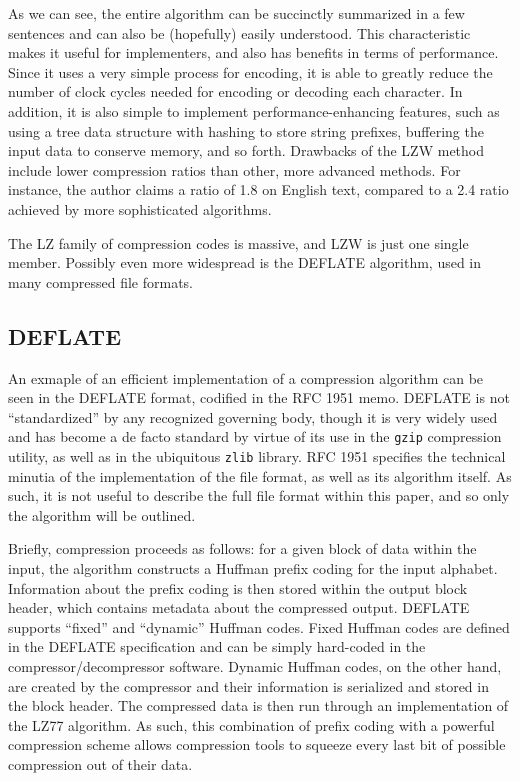\documentclass[12pt]{article}
\begin{document}
As we can see, the entire algorithm can be succinctly summarized in a
few sentences and can also be (hopefully) easily understood. This
characteristic makes it useful for implementers, and also has benefits
in terms of performance. Since it uses a very simple process for
encoding, it is able to greatly reduce the number of clock cycles
needed for encoding or decoding each character. In addition, it is
also simple to implement performance-enhancing features, such as using
a tree data structure with hashing to store string prefixes, buffering
the input data to conserve memory, and so forth. Drawbacks of the LZW
method include lower compression ratios than other, more advanced
methods. For instance, the author claims a ratio of 1.8 on English
text, compared to a 2.4 ratio achieved by more sophisticated
algorithms. \cite{LempelZivWelch}

The LZ family of compression codes is massive, and LZW is just one
single member. Possibly even more widespread is the DEFLATE algorithm,
used in many compressed file formats.

\subsection{DEFLATE}

An exmaple of an efficient implementation of a compression algorithm
can be seen in the DEFLATE format, codified in the RFC 1951
memo. \cite{RFC1951} DEFLATE is not ``standardized'' by any recognized
governing body, though it is very widely used and has become a de
facto standard by virtue of its use in the \texttt{gzip} compression
utility, as well as in the ubiquitous \texttt{zlib} library. RFC 1951
specifies the technical minutia of the implementation of the file
format, as well as its algorithm itself. As such, it is not useful to
describe the full file format within this paper, and so only the
algorithm will be outlined.

Briefly, compression proceeds as follows: for a given block of data
within the input, the algorithm constructs a Huffman prefix coding for
the input alphabet. Information about the prefix coding is then stored
within the output block header, which contains metadata about the
compressed output. DEFLATE supports ``fixed'' and ``dynamic'' Huffman
codes. Fixed Huffman codes are defined in the DEFLATE specification
and can be simply hard-coded in the compressor/decompressor
software. Dynamic Huffman codes, on the other hand, are created by the
compressor and their information is serialized and stored in the block
header. The compressed data is then run through an implementation of
the LZ77 algorithm. As such, this combination of prefix coding with a
powerful compression scheme allows compression tools to squeeze every
last bit of possible compression out of their data.
\end{document}
